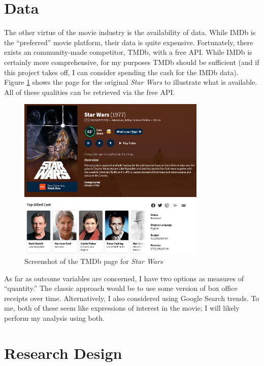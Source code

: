 \documentclass{article}
\begin{document}
\section{Data}

The other virtue of the movie industry is the availability of data. While IMDb is the ``preferred'' movie platform, their data is quite expensive. Fortunately, there exists an community-made competitor, TMDb, with a free API. While IMDb is certainly more comprehensive, for my purposes TMDb should be sufficient (and if this project takes off, I can consider spending the cash for the IMDb data). Figure \ref{fig:star_wars} shows the page for the original \emph{Star Wars} to illustrate what is available. All of these qualities can be retrieved via the free API.

\begin{figure}[h]
    \centering
    \includegraphics[width=0.8\textwidth]{star_wars_tmdb.png}
    \caption{Screenshot of the TMDb page for \emph{Star Wars}}
    \label{fig:star_wars}
\end{figure}

As far as outcome variables are concerned, I have two options as measures of ``quantity.'' The classic approach would be to use some version of box office receipts over time. Alternatively, I also considered using Google Search trends. To me, both of these seem like expressions of interest in the movie; I will likely perform my analysis using both. 


\section{Research Design}
\end{document}

